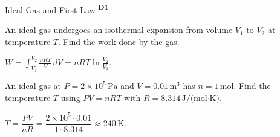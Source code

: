﻿\documentclass[12pt,a4paper]{article}
\providecommand{\KPProblems}{}
\newcommand{\DOne}{\texorpdfstring{\textsuperscript{\textbf{D1}}}{ D1}}
\begin{document}
\begin{KnowledgePoint}{Ideal Gas and First Law \DOne}
  \KPProblems
\begin{cheatproblem}
  An ideal gas undergoes an isothermal expansion from volume $V_1$ to $V_2$ at temperature $T$. Find the work done by the gas.
  \begin{solutionbox}
  $W=\int_{V_1}^{V_2} \frac{nRT}{V}\,dV=nRT\ln\!\frac{V_2}{V_1}$.
  \end{solutionbox}
  \end{cheatproblem}
\begin{cheatproblem}
  An ideal gas at $P=2\times10^5\,\text{Pa}$ and $V=0.01\,\text{m}^3$ has $n=1\,\text{mol}$. Find the temperature $T$ using $PV=nRT$ with $R=8.314\,\text{J/(mol·K)}$.
\begin{solutionbox}
  $T=\dfrac{PV}{nR}=\dfrac{2\times10^5\cdot0.01}{1\cdot8.314}\approx240\,\text{K}$.
  \end{solutionbox}
  \end{cheatproblem}
\end{KnowledgePoint}
\end{document}

